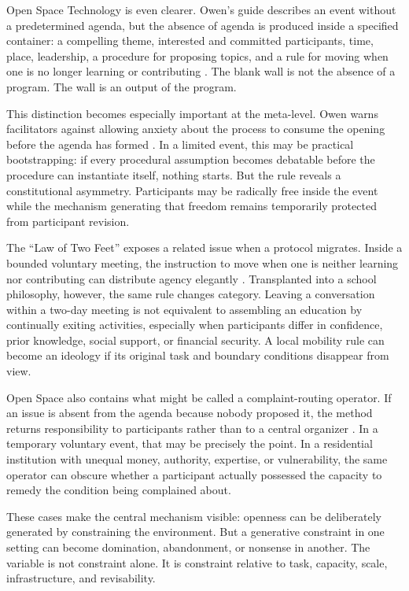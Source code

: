 \documentclass[11pt]{article}
\begin{document}
Open Space Technology is even clearer. Owen's guide describes an event without a predetermined agenda, but the absence of agenda is produced inside a specified container: a compelling theme, interested and committed participants, time, place, leadership, a procedure for proposing topics, and a rule for moving when one is no longer learning or contributing \cite{owen_open_space_guide}. The blank wall is not the absence of a program. The wall is an output of the program.

This distinction becomes especially important at the meta-level. Owen warns facilitators against allowing anxiety about the process to consume the opening before the agenda has formed \cite{owen_open_space_guide}. In a limited event, this may be practical bootstrapping: if every procedural assumption becomes debatable before the procedure can instantiate itself, nothing starts. But the rule reveals a constitutional asymmetry. Participants may be radically free inside the event while the mechanism generating that freedom remains temporarily protected from participant revision.

The ``Law of Two Feet'' exposes a related issue when a protocol migrates. Inside a bounded voluntary meeting, the instruction to move when one is neither learning nor contributing can distribute agency elegantly \cite{owen_open_space_guide}. Transplanted into a school philosophy, however, the same rule changes category. Leaving a conversation within a two-day meeting is not equivalent to assembling an education by continually exiting activities, especially when participants differ in confidence, prior knowledge, social support, or financial security. A local mobility rule can become an ideology if its original task and boundary conditions disappear from view.

Open Space also contains what might be called a complaint-routing operator. If an issue is absent from the agenda because nobody proposed it, the method returns responsibility to participants rather than to a central organizer \cite{owen_open_space_guide}. In a temporary voluntary event, that may be precisely the point. In a residential institution with unequal money, authority, expertise, or vulnerability, the same operator can obscure whether a participant actually possessed the capacity to remedy the condition being complained about.

These cases make the central mechanism visible: openness can be deliberately generated by constraining the environment. But a generative constraint in one setting can become domination, abandonment, or nonsense in another. The variable is not constraint alone. It is constraint relative to task, capacity, scale, infrastructure, and revisability.
\end{document}
